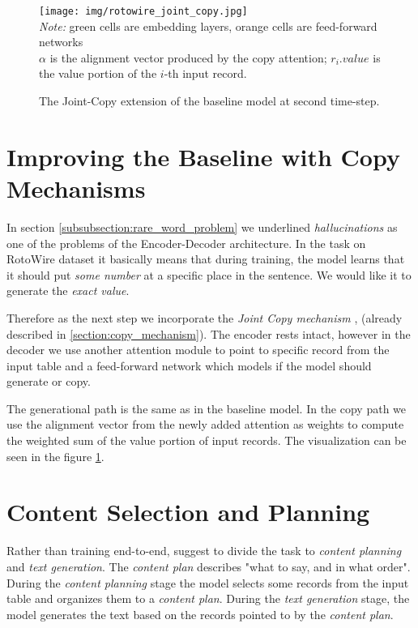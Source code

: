 \begin{figure}[!h]
    \centering
    \texttt{[image: img/rotowire\_joint\_copy.jpg]}
    \footnotesize{\\ \textit{Note:} green cells are embedding layers, orange cells are feed-forward networks \\ $\alpha$ is the alignment vector produced by the copy attention; $r_i.value$ is the value portion of the $i$-th input record.}
    \caption{\centering The Joint-Copy extension of the baseline model at second time-step.} \label{rotowire_joint_copy_vis}
\end{figure}

\section{Improving the Baseline with Copy Mechanisms} \label{section:copy_mechanism_intro}

In section \ref{subsubsection:rare_word_problem} we underlined \emph{hallucinations} as one of the problems of the Encoder-Decoder architecture. In the task on RotoWire dataset it basically means that during training, the model learns that it should put \emph{some number} at a specific place in the sentence. We would like it to generate the \emph{exact value}.

Therefore as the next step we incorporate the \emph{Joint Copy mechanism} \citep{gu2016incorporating}, \citep{yang2016referenceaware} (already described in \ref{section:copy_mechanism}). The encoder rests intact, however in the decoder we use another attention module to point to specific record from the input table and a feed-forward network which models if the model should generate or copy.

The generational path is the same as in the baseline model. In the copy path we use the alignment vector from the newly added attention as weights to compute the weighted sum of the value portion of input records. The visualization can be seen in the figure \ref{rotowire_joint_copy_vis}.

\section{Content Selection and Planning} \label{section:content_selection_and_planning}

Rather than training end-to-end, \citep{puduppully2019datatotext} suggest to divide the task to \emph{content planning} and \emph{text generation}. The \emph{content plan} describes "what to say, and in what order". During the \emph{content planning} stage the model selects some records from the input table and organizes them to a \emph{content plan}. During the \emph{text generation} stage, the model generates the text based on the records pointed to by the \emph{content plan}.

